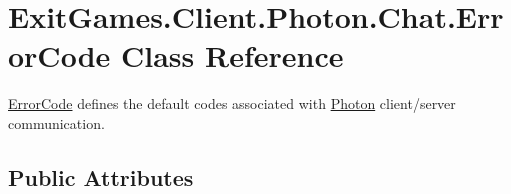 \hypertarget{class_exit_games_1_1_client_1_1_photon_1_1_chat_1_1_error_code}{}\section{Exit\+Games.\+Client.\+Photon.\+Chat.\+Error\+Code Class Reference}
\label{class_exit_games_1_1_client_1_1_photon_1_1_chat_1_1_error_code}


\hyperlink{class_exit_games_1_1_client_1_1_photon_1_1_chat_1_1_error_code}{Error\+Code} defines the default codes associated with \hyperlink{namespace_exit_games_1_1_client_1_1_photon}{Photon} client/server communication.  


\subsection*{Public Attributes}
